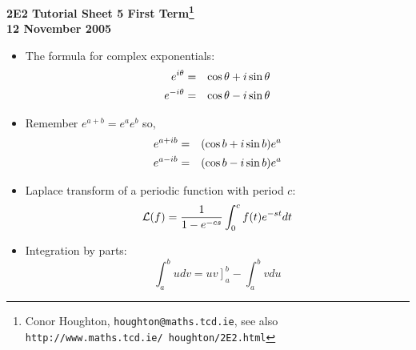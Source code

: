 \documentclass[12pt]{article}
\begin{document}
\begin{center}

{\bf 2E2 Tutorial Sheet 5 First Term\footnote{Conor Houghton, {\tt houghton@maths.tcd.ie}, see also {\tt http://www.maths.tcd.ie/ houghton/2E2.html}}\\[1cm] 12 November 2005}
\end{center}


\renewcommand{\labelenumi}{\arabic{enumi}.}
\begin{itemize}



\item The formula for complex exponentials:
\begin{eqnarray}
e^{i\theta}&=&\cos{\theta}+i\sin{\theta}\cr
e^{-i\theta}&=&\cos{\theta}-i\sin{\theta}
\end{eqnarray}

\item Remember $e^{a+b}=e^a e^b$ so, 
\begin{eqnarray}
e^{a+ib}&=&(\cos{b}+i\sin{b})e^{a}\cr
e^{a-ib}&=&(\cos{b}-i\sin{b})e^{a}
\end{eqnarray}

\item Laplace transform of a periodic function with
period $c$:
\begin{equation}
{\cal L}(f)=\frac{1}{1-e^{-cs}}\int_0^c f(t)e^{-st}dt
\end{equation}
\item Integration by parts:
\begin{equation}
\int_a^b udv=\left. uv\right]_a^b-\int_a^b vdu
\end{equation}
\end{itemize}

\newpage

\end{document}
